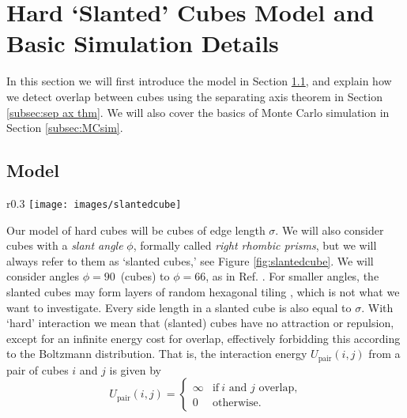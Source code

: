 \documentclass[thesis]{subfiles}
\begin{document}
\section{Hard `Slanted' Cubes Model and Basic Simulation Details}

In this section we will first introduce the model in Section \ref{subsec:model}, and explain how we detect overlap between cubes using the separating axis theorem in Section \ref{subsec:sep ax thm}. We will also cover the basics of Monte Carlo simulation in Section \ref{subsec:MCsim}.

\subsection{Model}\label{subsec:model}

\begin{wrapfigure}{r}{0.3\textwidth}
	\centering
	\vspace{-10pt}
	\texttt{[image: images/slantedcube]}
	\caption{A slanted cube with a slant angle $\phi$.}\label{fig:slantedcube}
	\vspace{-15pt}
\end{wrapfigure}

Our model of hard cubes will be cubes of edge length $\sigma$. We will also consider cubes with a \emph{slant angle} $\phi$, formally called \emph{right rhombic prisms}, but we will always refer to them as `slanted cubes,' see Figure \ref{fig:slantedcube}. We will consider angles $\phi = 90$\degr\ (cubes) to $\phi = 66$\degr, as in Ref. \cite{van2017phase}. For smaller angles, the slanted cubes may form layers of random hexagonal tiling\cite{van2016phase} , which is not what we want to investigate. Every side length in a slanted cube is also equal to $\sigma$. With `hard' interaction we mean that (slanted) cubes have no attraction or repulsion, except for an infinite energy cost for overlap, effectively forbidding this according to the Boltzmann distribution. That is, the interaction energy $U_{\textrm{pair}}(i,j)$ from a pair of cubes $i$ and $j$ is given by
\begin{equation}
U_{\textrm{pair}}(i,j) = 
\begin{cases}
\infty & \text{if}\ i \text{ and } j \text{ overlap,}\\
0 & \text{otherwise.}
\end{cases}
\end{equation}
\end{document}
